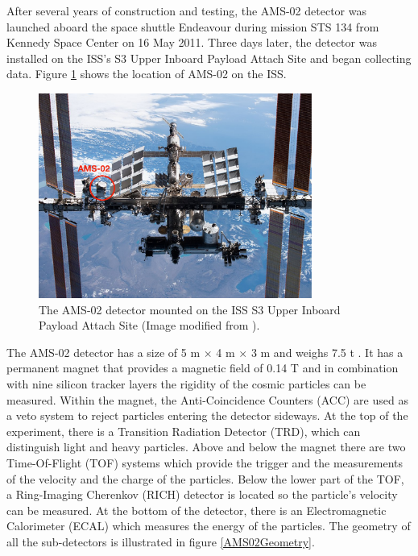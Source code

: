 After several years of construction and testing, the AMS-02 detector was launched aboard the space shuttle Endeavour during mission STS 134 from Kennedy Space Center on 16 May 2011. Three days later, the detector was installed on the ISS's S3 Upper Inboard Payload Attach Site and began collecting data. Figure \ref{AMS02OnISS} shows the location of AMS-02 on the ISS. \par

\begin{figure}[]
\centering
\includegraphics[width=0.8\textwidth, height=0.39\textheight ]{Figures/chapter3/Overview/AMS02OnISS.pdf}
\caption[The AMS-02 detector on the ISS.]{The AMS-02 detector mounted on the ISS S3 Upper Inboard Payload Attach Site (Image modified from \cite{wikiISS}). }
\label{AMS02OnISS}
\end{figure}

The AMS-02 detector has a size of 5 m $\times$ 4 m $\times$ 3 m and weighs 7.5 t \cite{PhysicsReport2}. It has a permanent magnet that provides a magnetic field of 0.14 T and in combination with nine silicon tracker layers the rigidity of the cosmic particles can be measured. Within the magnet, the Anti-Coincidence Counters (ACC) are used as a veto system to reject particles entering the detector sideways. At the top of the experiment, there is a Transition Radiation Detector (TRD), which can distinguish light and heavy particles. Above and below the magnet there are two Time-Of-Flight (TOF) systems which provide the trigger and the measurements of the velocity and the charge of the particles. Below the lower part of the TOF, a Ring-Imaging Cherenkov (RICH) detector is located so the particle's velocity can be measured. At the bottom of the detector, there is an Electromagnetic Calorimeter (ECAL) which measures the energy of the particles. The geometry of all the sub-detectors is illustrated in figure \ref{AMS02Geometry}. 

